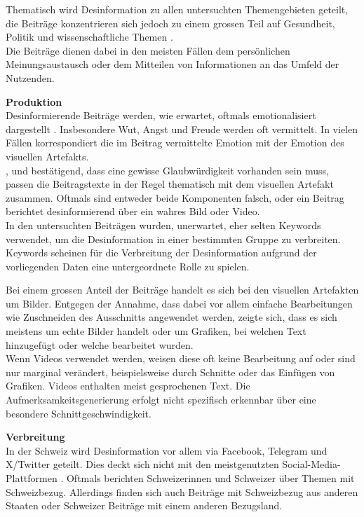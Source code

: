 \documentclass[12pt,a4paper]{article}        %
\begin{document}
Thematisch wird Desinformation zu allen untersuchten Themengebieten geteilt, die Beiträge konzentrieren sich jedoch zu einem grossen Teil auf Gesundheit, Politik und wissenschaftliche Themen \parencite[vgl.\ dazu ][2]{ceron_fake_2021}.\\
Die Beiträge dienen dabei in den meisten Fällen dem persönlichen Meinungsaustausch oder dem Mitteilen von Informationen an das Umfeld der Nutzenden.

\textbf{Produktion}\\
Desinformierende Beiträge werden, wie erwartet, oftmals emotionalisiert dargestellt \parencites[vgl.\ dazu][3703]{weikmann_visual_2023}[146]{teixeira_emotion-induced_2012}[23]{zhou_effects_2005}. Insbesondere Wut, Angst und Freude werden oft vermittelt. In vielen Fällen korrespondiert die im Beitrag vermittelte Emotion mit der Emotion des visuellen Artefakts.\\
\textcite[Pennycook et al. (2018), zit\ nach][182]{weidner_fake_2019}, \textcite[15]{bradshaw_industrialized_2021} und \textcite[3700]{weikmann_visual_2023} bestätigend, dass eine gewisse Glaubwürdigkeit vorhanden sein muss, passen die Beitragstexte in der Regel thematisch mit dem visuellen Artefakt zusammen. Oftmals sind entweder beide Komponenten falsch, oder ein Beitrag berichtet desinformierend über ein wahres Bild oder Video.\\
In den untersuchten Beiträgen wurden, unerwartet, eher selten Keywords verwendet, um die Desinformation in einer bestimmten Gruppe zu verbreiten. Keywords scheinen für die Verbreitung der Desinformation aufgrund der vorliegenden Daten eine untergeordnete Rolle zu spielen.

Bei einem grossen Anteil der Beiträge handelt es sich bei den visuellen Artefakten um Bilder. Entgegen der Annahme, dass dabei vor allem einfache Bearbeitungen wie Zuschneiden des Ausschnitts angewendet werden, zeigte sich, dass es sich meistens um echte Bilder handelt oder um Grafiken, bei welchen Text hinzugefügt oder welche bearbeitet wurden.\\ 
Wenn Videos verwendet werden, weisen diese oft keine Bearbeitung auf oder sind nur marginal verändert, beispielsweise durch Schnitte oder das Einfügen von Grafiken. Videos enthalten meist gesprochenen Text. Die Aufmerksamkeitsgenerierung erfolgt nicht spezifisch erkennbar über eine besondere Schnittgeschwindigkeit.

\textbf{Verbreitung}\\
In der Schweiz wird Desinformation vor allem via Facebook, Telegram und X/Twitter geteilt. Dies deckt sich nicht mit den meistgenutzten Social-Media-Plattformen \parencite[vgl.]{we_are_social_fuhrende_2025}. 
Oftmals berichten Schweizerinnen und Schweizer über Themen mit Schweizbezug. Allerdings finden sich auch Beiträge mit Schweizbezug aus anderen Staaten oder Schweizer Beiträge mit einem anderen Bezugsland.
\end{document}
